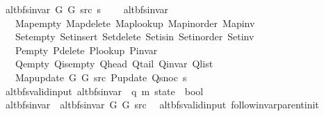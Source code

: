 \begin{isabellebody}
\ \ {\isachardoublequoteopen}alt{\isacharunderscore}{\kern0pt}bfs{\isacharunderscore}{\kern0pt}invar{\isacharprime}{\kern0pt}\ G{}\ G{}\ src\ s\ {\isasymequiv}\isanewline
\ \ \ alt{\isacharunderscore}{\kern0pt}bfs{\isacharunderscore}{\kern0pt}invar\isanewline
\ \ \ \ Map{\isacharunderscore}{\kern0pt}empty\ Map{\isacharunderscore}{\kern0pt}delete\ Map{\isacharunderscore}{\kern0pt}lookup\ Map{\isacharunderscore}{\kern0pt}inorder\ Map{\isacharunderscore}{\kern0pt}inv\isanewline
\ \ \ \ Set{\isacharunderscore}{\kern0pt}empty\ Set{\isacharunderscore}{\kern0pt}insert\ Set{\isacharunderscore}{\kern0pt}delete\ Set{\isacharunderscore}{\kern0pt}isin\ Set{\isacharunderscore}{\kern0pt}inorder\ Set{\isacharunderscore}{\kern0pt}inv\isanewline
\ \ \ \ P{\isacharunderscore}{\kern0pt}empty\ P{\isacharunderscore}{\kern0pt}delete\ P{\isacharunderscore}{\kern0pt}lookup\ P{\isacharunderscore}{\kern0pt}invar\isanewline
\ \ \ \ Q{\isacharunderscore}{\kern0pt}empty\ Q{\isacharunderscore}{\kern0pt}is{\isacharunderscore}{\kern0pt}empty\ Q{\isacharunderscore}{\kern0pt}head\ Q{\isacharunderscore}{\kern0pt}tail\ Q{\isacharunderscore}{\kern0pt}invar\ Q{\isacharunderscore}{\kern0pt}list\isanewline
\ \ \ \ Map{\isacharunderscore}{\kern0pt}update\ G{}\ G{}\ src\ P{\isacharunderscore}{\kern0pt}update\ Q{\isacharunderscore}{\kern0pt}snoc\ s{\isachardoublequoteclose}\isanewline
\isanewline
{}\isamarkupfalse%
\ {\isacharparenleft}{\kern0pt}\ alt{\isacharunderscore}{\kern0pt}bfs{\isacharunderscore}{\kern0pt}valid{\isacharunderscore}{\kern0pt}input{\isacharparenright}{\kern0pt}\ alt{\isacharunderscore}{\kern0pt}bfs{\isacharunderscore}{\kern0pt}invar{\isacharprime}{\kern0pt}{\isacharprime}{\kern0pt}\ {\isacharcolon}{\kern0pt}{\isacharcolon}{\kern0pt}\ {\isachardoublequoteopen}{\isacharparenleft}{\kern0pt}{\isacharprime}{\kern0pt}q{\isacharcomma}{\kern0pt}\ {\isacharprime}{\kern0pt}m{\isacharparenright}{\kern0pt}\ state\ {\isasymRightarrow}\ bool{\isachardoublequoteclose}\ \isanewline
\ \ {\isachardoublequoteopen}alt{\isacharunderscore}{\kern0pt}bfs{\isacharunderscore}{\kern0pt}invar{\isacharprime}{\kern0pt}{\isacharprime}{\kern0pt}\ {\isasymequiv}\ alt{\isacharunderscore}{\kern0pt}bfs{\isacharunderscore}{\kern0pt}invar{\isacharprime}{\kern0pt}\ G{}\ G{}\ src{\isachardoublequoteclose}\isanewline
\isanewline
{}\isamarkupfalse%
\ {\isacharparenleft}{\kern0pt}\ alt{\isacharunderscore}{\kern0pt}bfs{\isacharunderscore}{\kern0pt}valid{\isacharunderscore}{\kern0pt}input{\isacharparenright}{\kern0pt}\ follow{\isacharunderscore}{\kern0pt}invar{\isacharunderscore}{\kern0pt}parent{\isacharunderscore}{\kern0pt}init{\isacharcolon}{\kern0pt}\isanewline

\end{isabellebody}

